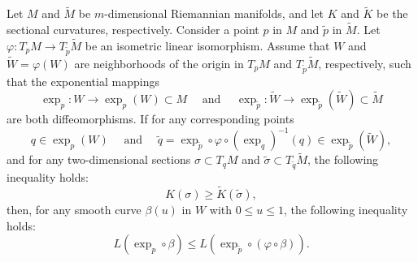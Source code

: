 \documentclass{ctexart}
\begin{document}
\begin{theorem}
  Let $M$ and $\tilde{M}$ be $m$-dimensional Riemannian manifolds, and let $K$ and $\tilde{K}$ be the sectional curvatures, respectively. Consider a point $p$ in $M$ and $\tilde{p}$ in $\tilde{M}$. 
  Let $\varphi: T_p M \rightarrow T_{\tilde{p}} \tilde{M}$ be an isometric linear isomorphism. Assume that $W$ and $\tilde{W}=\varphi(W)$ are neighborhoods of the origin in $T_p M$ and $T_{\tilde{p}} \tilde{M}$, 
  respectively, such that the exponential mappings
  $$
  \exp_p: W \rightarrow \exp_p(W) \subset M \quad \text{ and } \quad \exp_{\tilde{p}}: \tilde{W} \rightarrow \exp_{\tilde{p}}(\tilde{W}) \subset \tilde{M}
  $$
  are both diffeomorphisms. If for any corresponding points
  $$
  q \in \exp_p(W) \quad \text{ and } \quad \tilde{q}=\exp_{\tilde{p}} \circ \varphi \circ (\exp_q)^{-1}(q) \in \exp_{\tilde{p}}(\tilde{W}),
  $$
  and for any two-dimensional sections $\sigma \subset T_q M$ and $\tilde{\sigma} \subset T_{\tilde{q}} \tilde{M}$, the following inequality holds:
  $$
  K(\sigma) \geq \tilde{K}(\tilde{\sigma}),
  $$
  then, for any smooth curve $\beta(u)$ in $W$ with $0 \leq u \leq 1$, the following inequality holds:
  $$
  L(\exp_p \circ \beta) \leq L(\exp_{\tilde{p}} \circ (\varphi \circ \beta)).
  $$
\end{theorem}
\end{document}
